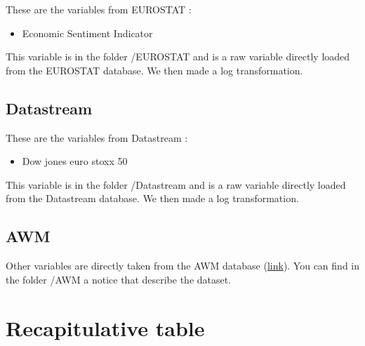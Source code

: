 \documentclass[11pt,a4paper]{article}
\begin{document}
These are the variables from EUROSTAT :
\begin{itemize}
\item Economic Sentiment Indicator
\end{itemize}

\vspace{0.5cm}

This variable is in the folder /EUROSTAT and is a raw variable directly loaded from the EUROSTAT database. We then made a log transformation. 

\subsection{Datastream}

These are the variables from Datastream :
\begin{itemize}
\item Dow jones euro stoxx 50
\end{itemize}

\vspace{0.5cm}

This variable is in the folder /Datastream and is a raw variable directly loaded from the Datastream database. We then made a log transformation. 


\subsection{AWM}

Other variables are directly taken from the AWM database (\href{http://www.eabcn.org/page/area-wide-model}{link}). You can find in the folder /AWM a notice that describe the dataset. 



\section{Recapitulative table}
\end{document}
